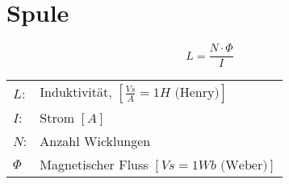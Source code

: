 



\section{Spule}
\[ L = \frac{N \cdot \Phi}{I} \]
\begin{tabular}{@{}ll}
  $L$:      & Induktivität, $\left[\frac{Vs}{A} = 1H \text{ (Henry)}\right]$ \\
  $I$:      & Strom $[A]$ \\
  $N$:      & Anzahl Wicklungen \\
  $\Phi$    & Magnetischer Fluss $\left[ Vs = 1Wb \text{ (Weber)}\right]$
\end{tabular}